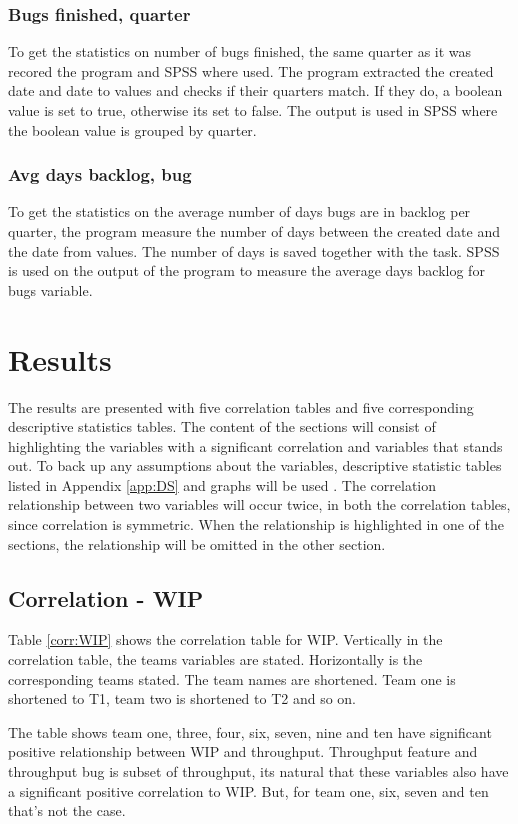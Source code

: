 \documentclass[UKenglish]{ifimaster}  %
\begin{document}
\subsection{Bugs finished, quarter}
To get the statistics on number of bugs finished, the same quarter as it was recored the program and SPSS where used. The program extracted the created date and date to values and checks if their quarters match. If they do, a boolean value is set to true, otherwise its set to false. The output is used in SPSS where the boolean value is grouped by quarter. 
\subsection{Avg days backlog, bug}
To get the statistics on the average number of days bugs are in backlog per quarter, the program measure the number of days between the created date and the date from values. The number of days is saved together with the task. SPSS is used on the output of the program to measure the average days backlog for bugs variable.



\chapter{Results}                     
\label{ch:res}
The results are presented with five correlation tables and five corresponding descriptive statistics tables.
The content of the sections will consist of highlighting the variables with a significant correlation and variables that stands out. To back up any assumptions about the variables, descriptive statistic tables listed in Appendix \ref{app:DS} and graphs will be used . The correlation relationship between two variables will occur twice, in both the correlation tables, since correlation is symmetric. When the relationship is highlighted in one of the sections, the relationship will be omitted in the other section. 

 
\section{Correlation - WIP}
\label{sec:corr:WIP}
Table \ref{corr:WIP} shows the correlation table for WIP. Vertically in the correlation table, the teams variables are stated. Horizontally is the corresponding teams stated. The team names are shortened. Team one is shortened to T1, team two is shortened to T2 and so on.

The table shows team one, three, four, six, seven, nine and ten have significant positive relationship between WIP and throughput. Throughput feature and throughput bug is subset of throughput, its natural that these variables also have a significant positive correlation to WIP. But, for team one, six, seven and ten that's not the case. 
\end{document}
